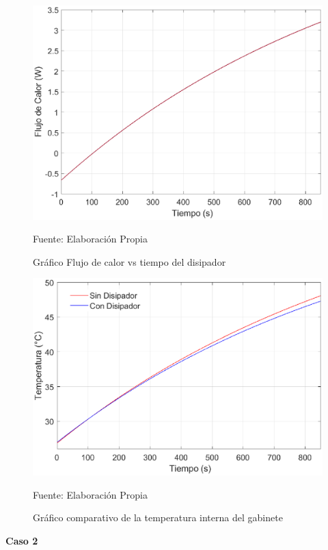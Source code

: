 \begin{figure}[H]
\centering
\includegraphics[scale=0.75]{Figuras/disipador_Q.eps}
\caption{Gráfico Flujo de calor vs tiempo del disipador}
Fuente: Elaboración Propia
\label{disipador Q}
\end{figure}

\begin{figure}[H]
\centering
\includegraphics[scale=0.75]{Figuras/disipador_comparacion.eps}
\caption{Gráfico comparativo de la temperatura interna del gabinete}
Fuente: Elaboración Propia
\label{disipador comparacion}
\end{figure}

\textbf{Caso 2}

